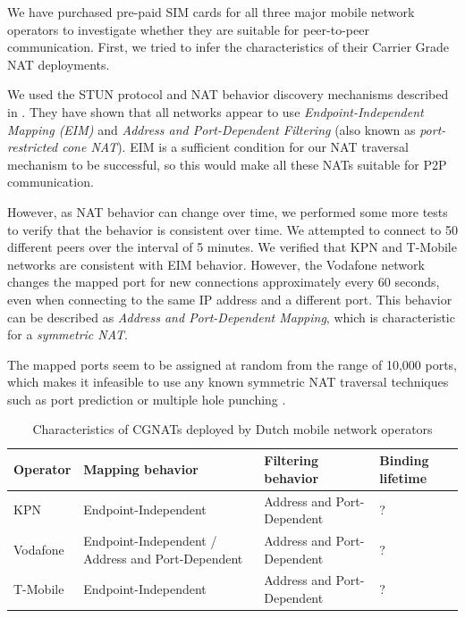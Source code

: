 We have purchased pre-paid SIM cards for all three major mobile network operators to investigate whether they are suitable for peer-to-peer communication. First, we tried to infer the characteristics of their Carrier Grade NAT deployments.

We used the STUN protocol and NAT behavior discovery mechanisms described in \cite{rfc5780}. They have shown that all networks appear to use \textit{Endpoint-Independent Mapping (EIM)} and \textit{Address and Port-Dependent Filtering} (also known as \textit{port-restricted cone NAT}). EIM is a sufficient condition for our NAT traversal mechanism to be successful, so this would make all these NATs suitable for P2P communication.

However, as NAT behavior can change over time, we performed some more tests to verify that the behavior is consistent over time. We attempted to connect to 50 different peers over the interval of 5 minutes. We verified that KPN and T-Mobile networks are consistent with EIM behavior. However, the Vodafone network changes the mapped port for new connections approximately every 60 seconds, even when connecting to the same IP address and a different port. This behavior can be described as \textit{Address and Port-Dependent Mapping}, which is characteristic for a \textit{symmetric NAT}.

The mapped ports seem to be assigned at random from the range of 10,000 ports, which makes it infeasible to use any known symmetric NAT traversal techniques such as port prediction or multiple hole punching \cite{multihole}\cite{takeda}.


\iffalse

\begin{table}[h!]
    \centering
    \begin{tabular}{ | l | l | l | l | }
        \hline
        \textbf{Operator} & \textbf{Mapping behavior} & \textbf{Filtering behavior} & \textbf{Binding lifetime} \\
        \hline
        KPN & Endpoint-Independent & Address and Port-Dependent & ? \\
        Vodafone & Endpoint-Independent / Address and Port-Dependent & Address and Port-Dependent & ? \\
        T-Mobile & Endpoint-Independent & Address and Port-Dependent & ? \\
        \hline
    \end{tabular}
    \caption{Characteristics of CGNATs deployed by Dutch mobile network operators}
    \label{table_cgnat_analysis}
\end{table}

